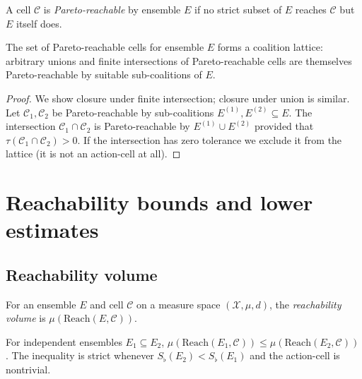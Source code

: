 \documentclass[11pt,a4paper]{article}
\newcommand{\X}{\mathcal{X}}
\newcommand{\Cell}{\mathcal{C}}
\newcommand{\Sfloor}{S_{\flat}}
\newcommand{\Reach}{\mathrm{Reach}}
\begin{document}
\begin{definition}\label{def:pareto}
A cell $\Cell$ is \emph{Pareto-reachable} by ensemble $E$ if no
strict subset of $E$ reaches $\Cell$ but $E$ itself does.
\end{definition}

\begin{theorem}\label{thm:coalition}
The set of Pareto-reachable cells for ensemble $E$ forms a coalition
lattice: arbitrary unions and finite intersections of
Pareto-reachable cells are themselves Pareto-reachable by suitable
sub-coalitions of $E$.
\end{theorem}

\begin{proof}
We show closure under finite intersection; closure under union is
similar. Let $\Cell_1,\Cell_2$ be Pareto-reachable by sub-coalitions
$E^{(1)},E^{(2)}\subseteq E$. The intersection $\Cell_1\cap\Cell_2$ is
Pareto-reachable by $E^{(1)}\cup E^{(2)}$ provided that
$\tau(\Cell_1\cap\Cell_2)>0$. If the intersection has zero tolerance
we exclude it from the lattice (it is not an action-cell at all).
\end{proof}

\section{Reachability bounds and lower estimates}
\label{sec:reach}

\subsection{Reachability volume}

\begin{definition}\label{def:rvol}
For an ensemble $E$ and cell $\Cell$ on a measure space $(\X,\mu,d)$,
the \emph{reachability volume} is
$\mu(\Reach(E,\Cell))$.
\end{definition}

\begin{theorem}\label{thm:rvol-mono}
For independent ensembles $E_1\subseteq E_2$,
$\mu(\Reach(E_1,\Cell))\le\mu(\Reach(E_2,\Cell))$. The inequality is
strict whenever $\Sfloor(E_2)<\Sfloor(E_1)$ and the action-cell is
nontrivial.
\end{theorem}
\end{document}
